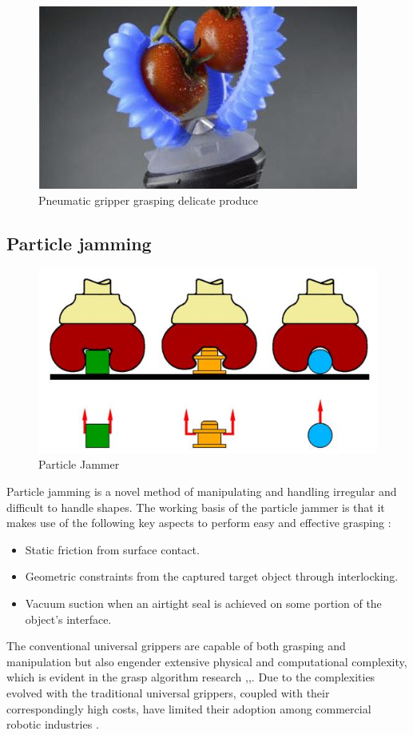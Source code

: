 \documentclass[11pt,twocolumn]{article}
\begin{document}
\begin{figure}[!h]
\centering
\includegraphics[scale=0.65]{gripped}
\caption{Pneumatic gripper grasping delicate produce}
\label{gripped}
\end{figure}
\subsection{Particle jamming}
\begin{figure}[!h]
\centering
\includegraphics[scale=0.65]{jammer1}
\caption{Particle Jammer}
\label{jammer1}
\end{figure}
\noindent
Particle jamming is a novel method of manipulating and handling irregular and difficult to handle shapes. The working basis of the particle jammer is that it makes use of the following key aspects to perform easy and effective grasping \cite{amend2012positive}:
\begin{itemize}
\item Static friction from surface contact.
\item Geometric constraints from the captured target object through interlocking.
\item Vacuum suction when an airtight seal is achieved on some portion of the object's interface.  
\end{itemize}
The conventional universal grippers are capable of both grasping and manipulation but also engender extensive physical and computational complexity, which is evident in the grasp algorithm research \cite{miller2003automatic},\cite{shimoga1996robot},\cite{saxena2008robotic}. Due to the complexities evolved with the traditional universal grippers, coupled with their correspondingly high costs, have limited their adoption among commercial robotic industries \cite{amend2012positive}.
\end{document}
